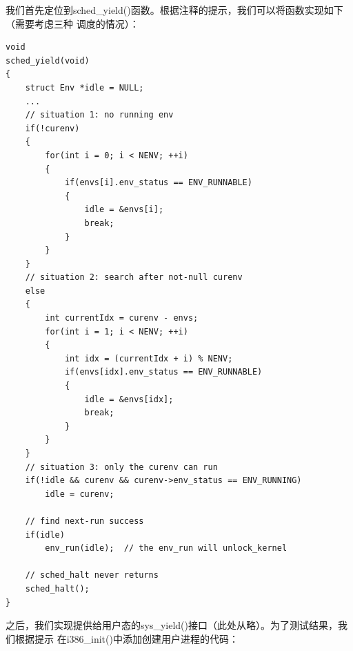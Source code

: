 \documentclass[12pt, letterpaper]{report}
\begin{document}
\newpage
我们首先定位到sched\_yield()函数。根据注释的提示，我们可以将函数实现如下（需要考虑三种
调度的情况）：\par 
\lstset{style=CStyle}
\setmainfont{Consolas}
\begin{lstlisting}
void
sched_yield(void)
{
    struct Env *idle = NULL;
    ...
    // situation 1: no running env
    if(!curenv)
    {
        for(int i = 0; i < NENV; ++i)
        {
            if(envs[i].env_status == ENV_RUNNABLE)
            {
                idle = &envs[i];
                break;
            }
        }
    }
    // situation 2: search after not-null curenv
    else
    {
        int currentIdx = curenv - envs;
        for(int i = 1; i < NENV; ++i)
        {
            int idx = (currentIdx + i) % NENV;
            if(envs[idx].env_status == ENV_RUNNABLE)
            {
                idle = &envs[idx];
                break;
            }
        }
    }
    // situation 3: only the curenv can run
    if(!idle && curenv && curenv->env_status == ENV_RUNNING)
        idle = curenv;

    // find next-run success
    if(idle)
        env_run(idle);	// the env_run will unlock_kernel

    // sched_halt never returns
    sched_halt();
}
\end{lstlisting}
\setmainfont{Times New Roman}

\newpage
之后，我们实现提供给用户态的sys\_yield()接口（此处从略）。为了测试结果，我们根据提示
在i386\_init()中添加创建用户进程的代码：\par 
\end{document}
